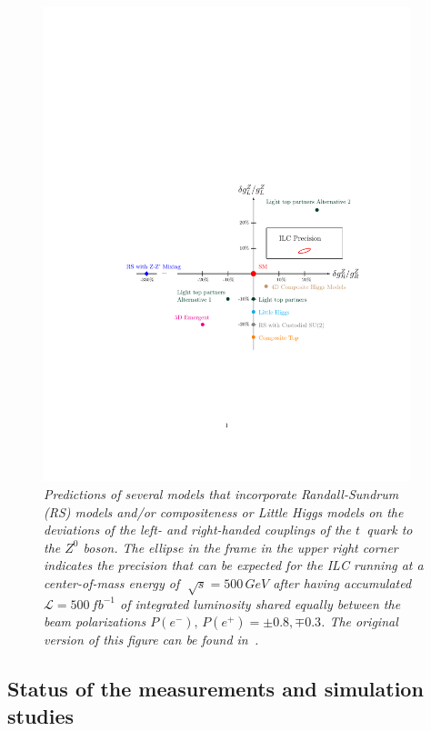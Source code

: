 \begin{figure}[h]
{\centering
    \includegraphics[clip, trim=4cm 7cm 2cm 10cm, width=0.95\textwidth]{ILD/graphics/plot.pdf}
    \caption{\sl Predictions of several models that incorporate Randall-Sundrum (RS) models and/or compositeness or Little Higgs models on the deviations of the left- and right-handed couplings of the $t$~quark to the $Z^0$ boson. The ellipse in the frame in the upper right corner indicates the precision that can be expected for the ILC running at a center-of-mass energy of $\sqrt[]{s} = 500\,GeV$ after having accumulated ${\mathcal L}=500\,fb^{-1}$ of integrated luminosity shared equally between the beam polarizations $P(e^-),\,P(e^+) =\pm0.8,\mp0.3$. The original version of this figure can be found in~\cite{bib:ILCTOP}.}
    \label{fig:DeviationsTop}
  }
\end{figure}
%
\subsection{Status of the measurements and simulation studies}
